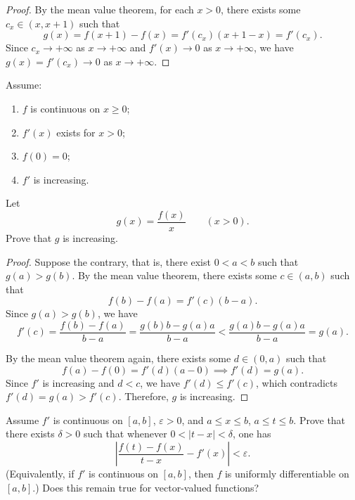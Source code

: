 \documentclass{article}
\begin{document}
\begin{proof}
  By the mean value theorem, for each \( x>0 \), there exists some \( c_x \in (x, x+1) \) such that
  \[ g(x)=f(x+1)-f(x)=f'(c_x)(x+1-x)=f'(c_x). \]
  Since \( c_x \to +\infty \) as \( x \to +\infty \) and \( f'(x) \to 0 \) as \( x \to +\infty \), we have \( g(x)=f'(c_x) \to 0 \) as \( x \to +\infty \).
\end{proof}



\begin{problem}[5-6]
Assume:
\begin{enumerate}[label=(\alph*)]
	\item $f$ is continuous on $x\ge 0$;
	\item $f'(x)$ exists for $x>0$;
	\item $f(0)=0$;
	\item $f'$ is increasing.
\end{enumerate}
Let
\[
g(x)=\frac{f(x)}{x}\qquad (x>0).
\]
Prove that $g$ is increasing.
\end{problem}

\begin{proof}
  Suppose the contrary, that is, there exist \( 0<a<b \) such that \( g(a) > g(b) \). By the mean value theorem, there exists some \( c \in (a,b) \) such that
  \[ f(b)-f(a)=f'(c)(b-a). \]
  Since \( g(a) > g(b) \), we have
  \[ f'(c)=\frac{f(b)-f(a)}{b-a}=\frac{g(b)b-g(a)a}{b-a}<\frac{g(a)b-g(a)a}{b-a}=g(a). \]\par
  By the mean value theorem again, there exists some \( d \in (0,a) \) such that
  \[ f(a)-f(0)=f'(d)(a-0)\implies f'(d)=g(a). \]
  Since \( f' \) is increasing and \( d < c \), we have \( f'(d) \le f'(c) \), which contradicts \( f'(d) = g(a) > f'(c) \). Therefore, \( g \) is increasing.
\end{proof}



\begin{problem}[5-8]
Assume $f'$ is continuous on $[a,b]$, $\varepsilon>0$, and $a\le x\le b$, $a\le t\le b$.
Prove that there exists $\delta>0$ such that whenever $0<|t-x|<\delta$, one has
\[
\left|\frac{f(t)-f(x)}{t-x}-f'(x)\right|<\varepsilon.
\]
(Equivalently, if $f'$ is continuous on $[a,b]$, then $f$ is uniformly differentiable on $[a,b]$.)
Does this remain true for vector-valued functions?
\end{problem}
\end{document}
